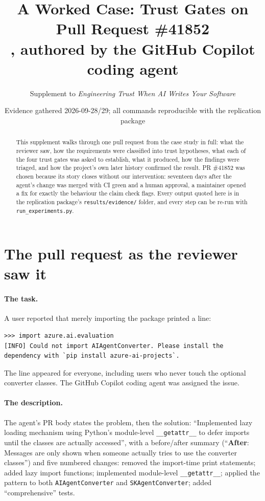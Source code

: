 \documentclass[11pt,a4paper]{article}
\title{A Worked Case: Trust Gates on Pull Request \#41852\\
\large \code{Azure/azure-sdk-for-python}, authored by the GitHub Copilot coding agent}
\author{Supplement to \emph{Engineering Trust When AI Writes Your Software}}
\date{Evidence gathered 2026-09-28/29; all commands reproducible with the replication package}
\newcommand{\code}[1]{\texttt{#1}}
\begin{document}
\maketitle

\begin{abstract}
\noindent This supplement walks through one pull request from the case study in full: what the reviewer saw, how the requirements were classified into trust hypotheses, what each of the four trust gates was asked to establish, what it produced, how the findings were triaged, and how the project's own later history confirmed the result. PR \#41852 was chosen because its story closes without our intervention: seventeen days after the agent's change was merged with CI green and a human approval, a maintainer opened a fix for exactly the behaviour the claim check flags. Every output quoted here is in the replication package's \code{results/evidence/} folder, and every step can be re-run with \code{run\_experiments.py}.
\end{abstract}

\section{The pull request as the reviewer saw it}

\paragraph{The task.} A user reported that merely importing the package printed a line:
\begin{lstlisting}[language={}]
>>> import azure.ai.evaluation
[INFO] Could not import AIAgentConverter. Please install the dependency with `pip install azure-ai-projects`.
\end{lstlisting}
The line appeared for everyone, including users who never touch the optional converter classes. The GitHub Copilot coding agent was assigned the issue.

\paragraph{The description.} The agent's PR body states the problem, then the solution: ``Implemented lazy loading mechanism using Python's module-level \code{\_\_getattr\_\_} to defer imports until the classes are actually accessed'', with a before/after summary (``\textbf{After}: Messages are only shown when someone actually tries to use the converter classes'') and five numbered changes: removed the import-time print statements; added lazy import functions; implemented module-level \code{\_\_getattr\_\_}; applied the pattern to both \code{AIAgentConverter} and \code{SKAgentConverter}; added ``comprehensive'' tests.
\end{document}
